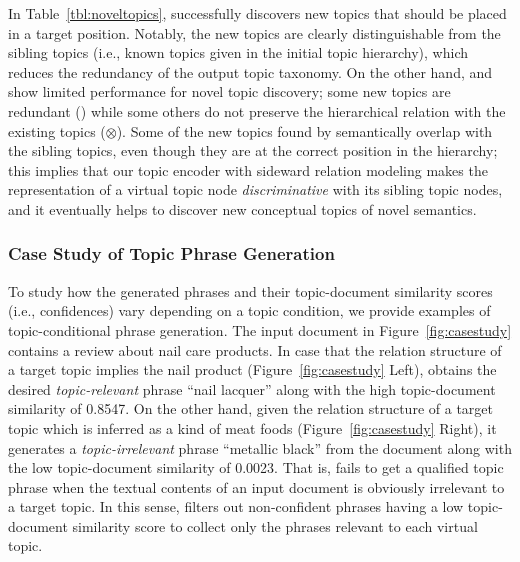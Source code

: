 In Table~\ref{tbl:noveltopics}, \proposedfull successfully discovers new topics that should be placed in a target position.
Notably, the new topics are clearly distinguishable from the sibling topics (i.e., known topics given in the initial topic hierarchy), which reduces the redundancy of the output topic taxonomy.
On the other hand, \corel and \taxocom show limited performance for novel topic discovery; 
some new topics are redundant () while some others do not preserve the hierarchical relation with the existing topics ($\otimes$).
Some of the new topics found by \proposedab semantically overlap with the sibling topics, even though they are at the correct position in the hierarchy;
this implies that our topic encoder with sideward relation modeling makes the representation of a virtual topic node \textit{discriminative} with its sibling topic nodes, and it eventually helps to discover new conceptual topics of novel semantics.

\subsubsection{Case Study of Topic Phrase Generation}
\label{subsubsec:casestudy}
To study how the generated phrases and their topic-document similarity scores (i.e., confidences) vary depending on a topic condition, we provide examples of topic-conditional phrase generation.
The input document in Figure~\ref{fig:casestudy} contains a review about nail care products. 
In case that the relation structure of a target topic implies the nail product (Figure~\ref{fig:casestudy} Left),
\proposed obtains the desired \textit{topic-relevant} phrase ``nail lacquer'' along with the high topic-document similarity of 0.8547.
On the other hand, given the relation structure of a target topic which is inferred as a kind of meat foods (Figure~\ref{fig:casestudy} Right),
it generates a \textit{topic-irrelevant} phrase ``metallic black'' from the document along with the low topic-document similarity of 0.0023.
That is, \proposed fails to get a qualified topic phrase when the textual contents of an input document is obviously irrelevant to a target topic. 
In this sense, \proposed filters out non-confident phrases having a low topic-document similarity score to collect only the phrases relevant to each virtual topic.

